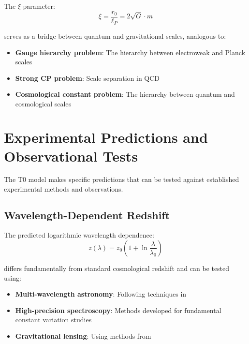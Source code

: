 \documentclass[12pt,a4paper]{article}
\begin{document}
	The $\xi$ parameter:
	\begin{equation}
		\xi = \frac{r_0}{\ell_P} = 2\sqrt{G} \cdot m
	\end{equation}
	
	serves as a bridge between quantum and gravitational scales, analogous to:
	\begin{itemize}
		\item \textbf{Gauge hierarchy problem}: The hierarchy between electroweak and Planck scales \citep{weinberg1995,susskind1979}
		\item \textbf{Strong CP problem}: Scale separation in QCD \citep{peccei1977,weinberg1978}
		\item \textbf{Cosmological constant problem}: The hierarchy between quantum and cosmological scales \citep{weinberg1989,carroll2001}
	\end{itemize}
	
	\section{Experimental Predictions and Observational Tests}
	\label{sec:experimental_tests}
	
	The T0 model makes specific predictions that can be tested against established experimental methods and observations.
	
	\subsection{Wavelength-Dependent Redshift}
	\label{subsec:wavelength_redshift}
	
	The predicted logarithmic wavelength dependence:
	\begin{equation}
		z(\lambda) = z_0\left(1 + \ln\frac{\lambda}{\lambda_0}\right)
	\end{equation}
	
	differs fundamentally from standard cosmological redshift and can be tested using:
	\begin{itemize}
		\item \textbf{Multi-wavelength astronomy}: Following techniques in \citep{longair2011,carroll2006}
		\item \textbf{High-precision spectroscopy}: Methods developed for fundamental constant variation studies \citep{uzan2003,murphy2003}
		\item \textbf{Gravitational lensing}: Using methods from \citep{schneider1992,bartelmann2001}
	\end{itemize}
	
\end{document}
